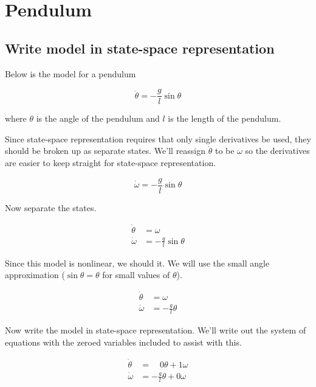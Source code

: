 \section{Pendulum}

\subsection{Write model in state-space representation}

Below is the \gls{model} for a pendulum

\begin{equation*}
  \ddot{\theta} = -\frac{g}{l}\sin\theta
\end{equation*}

where $\theta$ is the angle of the pendulum and $l$ is the length of the
pendulum.

Since state-space representation requires that only single derivatives be used,
they should be broken up as separate \glspl{state}. We'll reassign
$\dot{\theta}$ to be $\omega$ so the derivatives are easier to keep straight for
state-space representation.

\begin{equation*}
  \dot{\omega} = -\frac{g}{l}\sin\theta
\end{equation*}

Now separate the \glspl{state}.

\begin{align*}
  \dot{\theta} &= \omega \\
  \dot{\omega} &= -\frac{g}{l} \sin\theta
\end{align*}

Since this \gls{model} is nonlinear, we should
  it.
We will use the small angle approximation ($\sin\theta = \theta$ for small
values of $\theta$).

\begin{align*}
  \dot{\theta} &= \omega \\
  \dot{\omega} &= -\frac{g}{l} \theta
\end{align*}

Now write the \gls{model} in state-space representation. We'll write out the
system of equations with the zeroed variables included to assist with this.

\begin{align*}
  \dot{\theta} &= \;\;\;\,0 \theta + 1 \omega \\
  \dot{\omega} &= -\frac{g}{l} \theta + 0 \omega
\end{align*}

